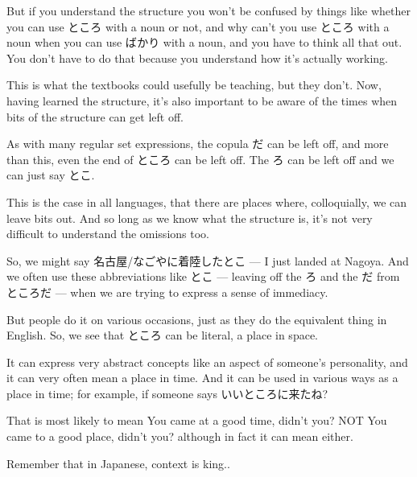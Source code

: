 But if you understand the structure you won't be confused by things like whether you can use ところ with a noun or not, and why can't you use ところ with a noun when you can use ばかり with a noun, and you have to think all that out. You don't have to do that because you understand how it's actually working.

This is what the textbooks could usefully be teaching, but they don't. Now, having learned the structure, it's also important to be aware of the times when bits of the structure can get left off.

As with many regular set expressions, the copula だ can be left off, and more than this, even the end of ところ can be left off. The ろ can be left off and we can just say とこ.

This is the case in all languages, that there are places where, colloquially, we can leave bits out. And so long as we know what the structure is, it's not very difficult to understand the omissions too.

So, we might say 名古屋/なごやに着陸したとこ --- I just landed at Nagoya. And we often use these abbreviations like とこ --- leaving off the ろ and the だ from ところだ --- when we are trying to express a sense of immediacy.

But people do it on various occasions, just as they do the equivalent thing in English. So, we see that ところ can be literal, a place in space.

It can express very abstract concepts like an aspect of someone's personality, and it can very often mean a place in time. And it can be used in various ways as a place in time; for example, if someone says いいところに来たね?

That is most likely to mean You came at a good time, didn't you? NOT You came to a good place, didn't you? although in fact it can mean either.

Remember that in Japanese, context is king..

\stopsectionlevel

